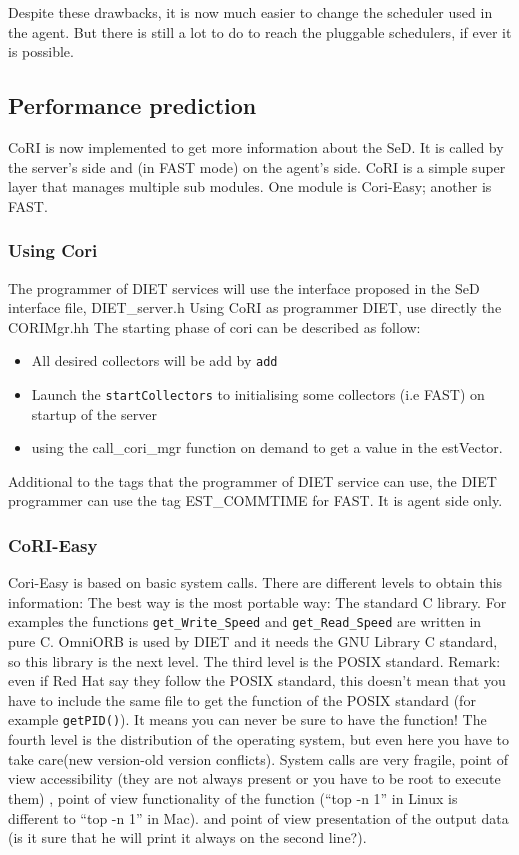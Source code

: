   Despite these drawbacks, it is now much easier to change the scheduler used in
  the agent. But there is still a lot to do to reach the pluggable schedulers, if
  ever it is possible.

  \subsection{Performance prediction}\label{subsection:performance}
  CoRI is now implemented to get more information about the SeD.
  It is called by the server's side and (in FAST mode) on the agent's side. 
  CoRI is a simple super layer that manages multiple sub modules. One module
  is Cori-Easy; another is FAST.

  \subsubsection{Using Cori}
  The programmer of DIET services will use the
  interface proposed in the SeD interface file, \textsf{DIET\_server.h}
  Using CoRI as programmer DIET, use directly the
  \textsf{CORIMgr.hh}
  The starting phase of cori can be described as follow:
   \begin{itemize}
  \item All desired collectors will be add by \texttt{add} 
  \item Launch the \texttt{startCollectors} to initialising some collectors
    (i.e FAST) on startup of the server
  \item using the \textsf{call\_cori\_mgr} function on 
    demand to get a value in the estVector.
  \end{itemize}
  
  Additional to the tags that the programmer of DIET
  service can use, the DIET programmer can use 
  the tag EST\_COMMTIME for FAST. It is agent side only. 

  \subsubsection{CoRI-Easy}
  Cori-Easy is based on basic system calls. There are different
   levels to obtain this information: 
  The best way is the most portable way: The standard C library. For examples the
  functions \texttt{get\_Write\_Speed} and \texttt{get\_Read\_Speed} are written in pure C.
  OmniORB is used by DIET and it needs the GNU Library C standard, 
  so this library is the next level.
  The third level is the POSIX standard. Remark: even if Red Hat 
  say they follow the POSIX standard, this doesn't mean that you have to include the same file
  to get the function of the POSIX standard (for example \texttt{getPID()}). 
  It means you can never be sure to have the function!
  The fourth level is the distribution of the operating system, 
  but even here you have to take care(new version-old version conflicts). 
  System calls are very fragile, point of view accessibility 
  (they are not always present or you have to be root to execute them)
  , point of view functionality of the function (``top -n 1'' 
  in Linux is different to ``top -n 1'' in Mac).
  and point of view presentation of the output data (is it sure that 
  he will print it always on the second line?).

